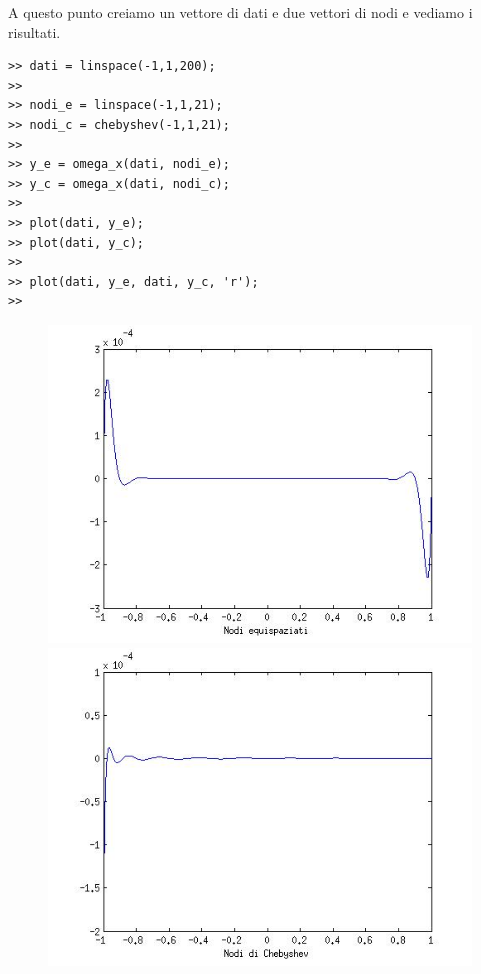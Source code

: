 \begin{enumerate}
\begin{svol}
\begin{codice}
\begin{verbatim}
\end{verbatim}
\end{codice}
A questo punto creiamo un vettore di dati e due vettori di nodi e vediamo
i risultati.
\begin{codice}
\begin{verbatim}
>> dati = linspace(-1,1,200);
>> 
>> nodi_e = linspace(-1,1,21);
>> nodi_c = chebyshev(-1,1,21);
>> 
>> y_e = omega_x(dati, nodi_e);
>> y_c = omega_x(dati, nodi_c);
>> 
>> plot(dati, y_e);
>> plot(dati, y_c);
>> 
>> plot(dati, y_e, dati, y_c, 'r');
>> 
\end{verbatim}
\end{codice}
\begin{figure}[!ht]\begin{center}
\includegraphics[scale=.35]{fig/es6-3a.jpg}
\includegraphics[scale=.35]{fig/es6-3b.jpg}

\end{center}
\end{figure}
\end{svol}
\end{enumerate}
